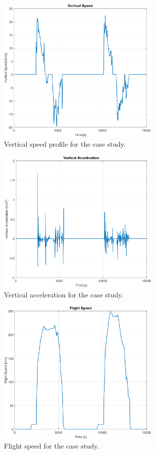 \documentclass[english]{kththesis}
\begin{document}
\begin{figure}[!ht]
    \centering
    \includegraphics[width=0.7\textwidth]{Epictures/VerticalSpeed.png}
    \caption{Vertical speed profile for the case study.}
    \label{fig:VerticalSpeed}
\end{figure}

\begin{figure}[!ht]
    \centering
    \includegraphics[width=0.7\textwidth]{Epictures/VerticalAcceleration.png}
    \caption{Vertical acceleration for the case study.}
    \label{fig:VerticalAcceleration}
\end{figure}

\begin{figure}[!ht]
    \centering
    \includegraphics[width=0.7\textwidth]{Epictures/FlightSpeed.png}
    \caption{Flight speed for the case study.}
    \label{fig:FlightSpeed}
\end{figure}
\end{document}
